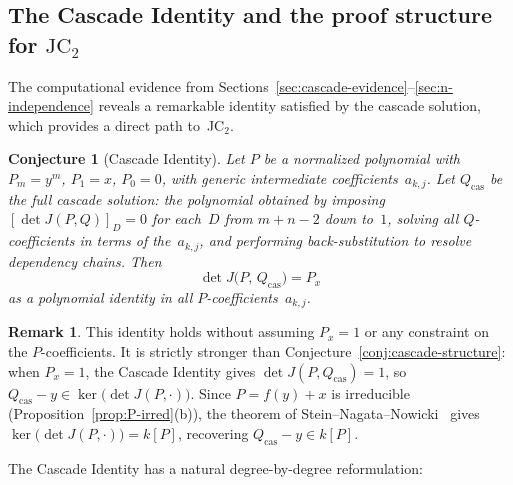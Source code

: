 \documentclass[12pt,a4paper]{article}
\newtheorem{conjecture}[theorem]{Conjecture}
\theoremstyle{definition}
\newtheorem{remark}[theorem]{Remark}
\newcommand{\kk}{k}
\begin{document}
\subsection{The Cascade Identity and the proof structure for $\mathrm{JC}_2$}%
\label{sec:cascade-identity-conj}

The computational evidence from
Sections~\ref{sec:cascade-evidence}--\ref{sec:n-independence}
reveals a remarkable identity satisfied by the cascade solution,
which provides a direct path to~JC$_2$.

\begin{conjecture}[Cascade Identity]\label{conj:cascade-identity}
Let $P$ be a normalized polynomial with $P_m = y^m$, $P_1 = x$,
$P_0 = 0$, with generic intermediate coefficients~$a_{k,j}$.
Let $Q_{\mathrm{cas}}$ be the full cascade solution: the polynomial
obtained by imposing $[\det J(P,Q)]_D = 0$ for each~$D$ from
$m+n-2$ down to~$1$, solving all $Q$-coefficients in terms
of the~$a_{k,j}$, and performing back-substitution to resolve
dependency chains. Then
\[
  \det J\bigl(P,\, Q_{\mathrm{cas}}\bigr) = P_x
\]
as a polynomial identity in all $P$-coefficients~$a_{k,j}$.
\end{conjecture}

\begin{remark}
This identity holds without assuming $P_x = 1$ or any constraint
on the $P$-coefficients.  It is strictly stronger than
Conjecture~\ref{conj:cascade-structure}: when $P_x = 1$,
the Cascade Identity gives $\det J(P, Q_{\mathrm{cas}}) = 1$,
so $Q_{\mathrm{cas}} - y \in \ker\bigl(\det J(P, \cdot)\bigr)$.
Since $P = f(y) + x$ is irreducible
(Proposition~\ref{prop:P-irred}\textup{(b)}),
the theorem of Stein--Nagata--Nowicki~\cite{Nagata1977,Nowicki1988}
gives $\ker\bigl(\det J(P, \cdot)\bigr) = \kk[P]$,
recovering $Q_{\mathrm{cas}} - y \in \kk[P]$.
\end{remark}

The Cascade Identity has a natural degree-by-degree reformulation:
\end{document}
